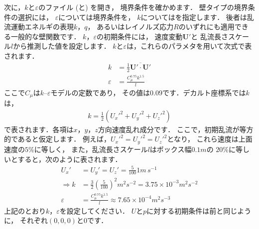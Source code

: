 次に，$k$と$\varepsilon$のファイル (と) を開き，
境界条件を確かめます．
壁タイプの境界条件の選択には，
$\varepsilon$については境界条件を，
$k$についてはを指定します．
後者は乱流運動エネルギの表現$k$，$q$，
あるいはレイノルズ応力$R$のいずれにも適用できる一般的な壁関数です．
$k$，$\varepsilon$の初期条件には，
速度変動$\bm{U}'$と
%
乱流長さスケール$l$から推測した値を設定します．
$k$と$\varepsilon$は，これらのパラメタを用いて次式で表されます．
\begin{align}
 \label{eq:2.8}
  k &= \frac{1}{2}\overline{\bm{U}' \cdot \bm{U}'} \\
 \label{eq:2.9}
 \varepsilon &= \frac{C_{\mu}^{0.75}k^{1.5}}{l}
\end{align}
ここで$C_{\mu}$は$k$--$\varepsilon$モデルの定数であり，
その値は$0.09$です．デカルト座標系では$k$は，
\begin{align}
 \label{eq:2.10}
 k = \frac{1}{2}({U_{x}'}^{2} + {U_{y}'}^{2} + {U_{z}'}^{2})
\end{align}
で表されます．各項は$x$，$y$，$z$方向速度乱れ成分です．
ここで，初期乱流が等方的であると仮定します．
例えば，${U_{x}'}^{2} = {U_{y}'}^{2} = {U_{z}'}^{2}$となり，
これら速度は上面速度の$5\unit{\%}$に等しく，
また，乱流長さスケール$l$はボックス幅$0.1\unit{m}$の
$20\unit{\%}$に等しいとすると，次のように表されます．
\begin{align}
 \label{eq:2.11}
 U_{x}' &= U_{y}' = U_{z}' = \frac{5}{100}1\unit{m\,s^{-1}} \\
 \label{eq:2.12}
 \Rightarrow k &= \frac{3}{2}\left(\frac{5}{100}\right)^{2}\unit{m^{2}s^{-2}}
 = 3.75 \times 10^{-3}\unit{m^{2}s^{-2}} \\
 \label{eq:2.13}
 \varepsilon &= \frac{C_{\mu}^{0.75}k^{1.5}}{l}
 \approx 7.65 \times 10^{-4}\unit{m^{2}s^{-3}}
\end{align}
上記のとおり$k$，$\varepsilon$を設定してください．
$U$と$p$に対する初期条件は前と同じように，
それぞれ$(0, 0, 0)$と$0$です．

